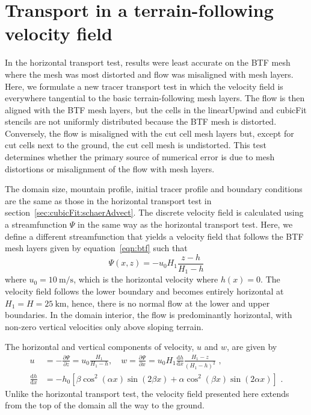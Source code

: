 \section{Transport in a terrain-following velocity field}
\label{sec:cubicFit:tfAdvect}

In the horizontal transport test, results were least accurate on the BTF mesh where the mesh was most distorted and flow was misaligned with mesh layers.
Here, we formulate a new tracer transport test in which the velocity field is everywhere tangential to the basic terrain-following mesh layers.
The flow is then aligned with the BTF mesh layers, but the cells in the linearUpwind and cubicFit stencils are not uniformly distributed because the BTF mesh is distorted.
Conversely, the flow is misaligned with the cut cell mesh layers but, except for cut cells next to the ground, the cut cell mesh is undistorted.
This test determines whether the primary source of numerical error is due to mesh distortions or misalignment of the flow with mesh layers.

The domain size, mountain profile, initial tracer profile and boundary conditions are the same as those in the horizontal transport test in section~\ref{sec:cubicFit:schaerAdvect}.
The discrete velocity field is calculated using a streamfunction $\Psi$ in the same way as the horizontal transport test.
Here, we define a different streamfunction that yields a velocity field that follows the BTF mesh layers given by equation~\eqref{eqn:btf} such that
\begin{equation}
	\Psi(x,z) = -u_0 H_1 \frac{z - h}{H_1 - h} \label{eqn:streamfunc-btf}
\end{equation}
where $u_0 = \SI{10}{\meter\per\second}$, which is the horizontal velocity where $h(x) = 0$.
The velocity field follows the lower boundary and becomes entirely horizontal at $H_1 = H = \SI{25}{\kilo\meter}$, hence, there is no normal flow at the lower and upper boundaries.
In the domain interior, the flow is predominantly horizontal, with non-zero vertical velocities only above sloping terrain.

The horizontal and vertical components of velocity, $u$ and $w$, are given by
\begin{align}
	u &= -\frac{\partial \Psi}{\partial z} = u_0 \frac{H_1}{H_1 - h}, \quad w = \frac{\partial \Psi}{\partial x} = u_0 H_1 \frac{\mathrm{d} h}{\mathrm{d} x} \frac{H_1 - z}{\left( H_1 - h \right)^2} \label{eqn:slanted:uw-btf} \text{ ,}\\
	\frac{\mathrm{d} h}{\mathrm{d} x} &= - h_0 \left[ 
		\beta \cos^2 \left( \alpha x \right) \sin \left( 2 \beta x \right) +
		\alpha \cos^2 \left( \beta x \right) \sin \left( 2 \alpha x \right)
	\right] \text{ .}
\end{align}
Unlike the horizontal transport test, the velocity field presented here extends from the top of the domain all the way to the ground.

